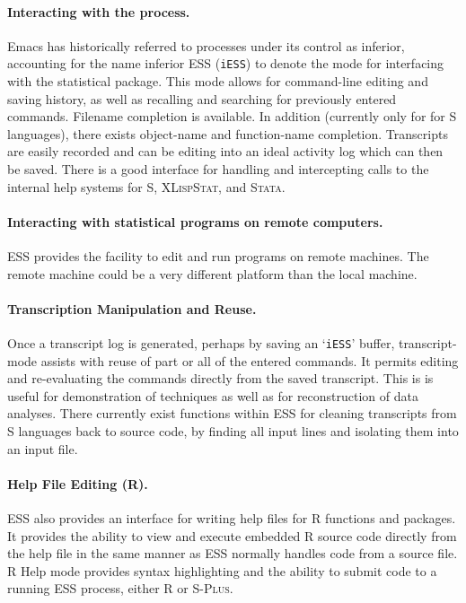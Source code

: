 \documentclass{article}
\newcommand*{\Splus}{\textsc{S-Plus}}
\newcommand*{\XLispStat}{\textsc{XLispStat}}
\newcommand*{\Stata}{\textsc{Stata}}
\newcommand{\stexttt}[1]{{\small\texttt{#1}}}
\newcommand{\file}[1]{`\stexttt{#1}'}
\begin{document}
\paragraph{Interacting with the process.}
Emacs has historically referred to processes under its control as
inferior, accounting for the name inferior ESS (\stexttt{iESS}) to
denote the mode for interfacing with the statistical package.  This
mode allows for command-line editing and saving history, as well as
recalling and searching for previously entered commands.
Filename completion is available.    In addition (currently only for for S
languages), there exists object-name and function-name completion.
Transcripts are easily recorded and can be editing into an ideal
activity log which can then be saved.  There is a good interface for
handling and intercepting calls to the internal help systems for S,
\XLispStat, and \Stata.

\paragraph{Interacting with statistical programs on remote computers.}
ESS provides the facility to edit and run programs on remote machines.
The remote machine could be a very different platform than the local
machine.

\paragraph{Transcription Manipulation and Reuse.}
Once a transcript log is generated, perhaps by saving an
\file{iESS} buffer, transcript-mode assists with reuse of part or
all of the entered commands.  It permits editing and re-evaluating the
commands directly from the saved transcript.  This is is useful for
demonstration of techniques as well as for reconstruction of data
analyses.  There currently exist functions within ESS for cleaning
transcripts from S languages back to source code, by finding all input
lines and isolating them into an input file.

\paragraph{Help File Editing (R).}
ESS also provides an interface for writing help files for R functions
and packages.  It provides the ability to view and execute embedded R
source code directly from the help file in the same manner as ESS
normally handles code from a source file.  R Help mode provides syntax
highlighting and the ability to submit code to a running ESS
process, either R or \Splus.
\end{document}

